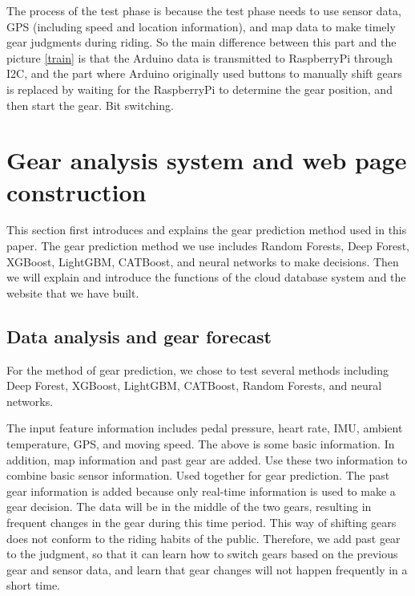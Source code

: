 \documentclass[conference]{IEEEtran}
\begin{document}
The process of the test phase is because the test phase needs to use sensor data, GPS (including speed and location information), and map data to make timely gear judgments during riding. So the main difference between this part and the picture \ref{train} is that the Arduino data is transmitted to RaspberryPi through I2C, and the part where Arduino originally used buttons to manually shift gears is replaced by waiting for the RaspberryPi to determine the gear position, and then start the gear. Bit switching.

\section{Gear analysis system and web page construction}

This section first introduces and explains the gear prediction method used in this paper. The gear prediction method we use includes Random Forests, Deep Forest, XGBoost, LightGBM, CATBoost, and neural networks to make decisions. Then we will explain and introduce the functions of the cloud database system and the website that we have built.

\subsection{Data analysis and gear forecast}

For the method of gear prediction, we chose to test several methods including Deep Forest, XGBoost, LightGBM, CATBoost, Random Forests, and neural networks.


The input feature information includes pedal pressure, heart rate, IMU, ambient temperature, GPS, and moving speed. The above is some basic information. In addition, map information and past gear are added. Use these two information to combine basic sensor information. Used together for gear prediction. The past gear information is added because only real-time information is used to make a gear decision. The data will be in the middle of the two gears, resulting in frequent changes in the gear during this time period. This way of shifting gears does not conform to the riding habits of the public. Therefore, we add past gear to the judgment, so that it can learn how to switch gears based on the previous gear and sensor data, and learn that gear changes will not happen frequently in a short time.
\end{document}

